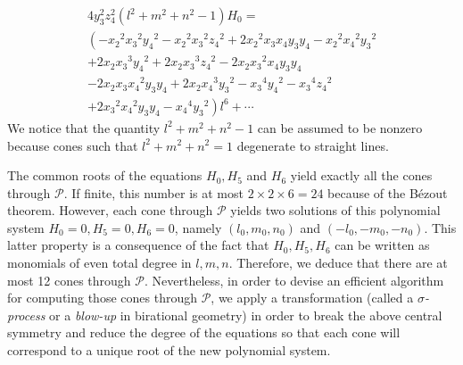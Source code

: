 \documentclass[5p]{elsarticle}
\newcommand\Pc{\mathcal P}
\newcommand{\com}[1]{{\color{black} #1}}
\begin{document}
\begin{multline*}
4y_3^2z_4^2(l^2+m^2+n^2-1)H_0= \\
 \left( -{{ x_2}}^{2}{{ x_3}}^{2}{{ y_4}}^{2}-{{ x_2}}^{2}{{
 x_3}}^{2}{{ z_4}}^{2}+2 {{ x_2}}^{2}{ x_3} { x_4} { 
y_3} { y_4}-{{ x_2}}^{2}{{ x_4}}^{2}{{ y_3}}^{2} \right. \\ \left. +2 { x_2} 
{{ x_3}}^{3}{{ y_4}}^{2} +2 { x_2} {{ x_3}}^{3}{{ z_4}}^{2} 
-2 { x_2} {{ x_3}}^{2}{ x_4} { y_3} { y_4} \right. \\
\left. 
-2 { x_2} 
{ x_3} {{ x_4}}^{2}{ y_3} { y_4}+2 { x_2} {{ x_4}}^{3}
{{ y_3}}^{2}-{{ x_3}}^{4}{{ y_4}}^{2}-{{ x_3}}^{4}{{ z_4}}^{
2}  \right. \\ \left. +2 {{ x_3}}^{2}{{ x_4}}^{2}{ y_3} { y_4}-{{ x_4}}^{4}{{
 y_3}}^{2} \right) {l}^{6} +\cdots 
\end{multline*}
We notice that the quantity $l^2+m^2+n^2-1$ can be assumed to be nonzero because cones such that $l^2+m^2+n^2=1$ \com{degenerate} to straight lines. 
 
 
The common roots of the equations $H_0,H_5$ and $H_6$ \com{yield} exactly all the cones through $\Pc$. If finite, this number is at most  $2\times 2\times 6=24$ because of the B\'ezout theorem. However, each cone through $\Pc$ yields two solutions of this polynomial system $H_0=0,H_5=0,H_6=0$, namely $(l_0,m_0,n_0)$ and $(-l_0,-m_0,-n_0)$. This latter property is a consequence of the fact that $H_0,H_5,H_6$ \com{can be written as} monomials of even total degree in $l,m,n$. Therefore, we deduce that \com{there are} at most 12 cones through $\Pc$. Nevertheless, in order to devise an efficient algorithm for computing those cones through $\Pc$, we apply a transformation (called a \emph{$\sigma$-process} or a \emph{blow-up} in birational geometry) in order to break the above central symmetry and reduce the degree of the equations so that each cone will correspond to a unique root of the new polynomial system. 
\end{document}
